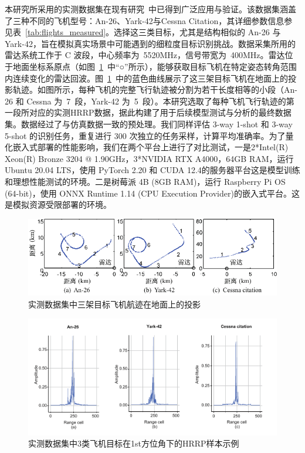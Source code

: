 本研究所采用的实测数据集在现有研究~中已得到广泛应用与验证。该数据集涵盖了三种不同的飞机型号：An-26、Yark-42与Cessna Citation，其详细参数信息参见表~\ref{tab:flights_measured}。选择这三类目标，尤其是结构相似的 An-26 与 Yark-42，旨在模拟真实场景中可能遇到的细粒度目标识别挑战。数据采集所用的雷达系统工作于 C 波段，中心频率为~5520$\mathrm{MHz}$，信号带宽为~400$\mathrm{MHz}$。雷达位于地面坐标系原点（如图~\ref{fig:route}~中“○”所示），能够获取目标飞机在特定姿态转角范围内连续变化的雷达回波。图~\ref{fig:route}~中的蓝色曲线展示了这三架目标飞机在地面上的投影轨迹。如图所示，每种飞机的完整飞行轨迹被分割为若干长度相等的小段（An-26 和 Cessna 为~7~段，Yark-42 为~5~段）。本研究选取了每种飞机飞行轨迹的{第一段}所对应的实测HRRP数据，据此构建了用于后续模型测试与分析的最终数据集。数据经过了与仿真数据一致的预处理。我们同样评估 3-way 1-shot 和 3-way 5-shot 的识别任务，重复进行 300 次独立的任务采样，计算平均准确率。为了量化嵌入式部署的性能影响，我们在两个平台上进行了对比测试，一是2*Intel(R) Xeon(R) Bronze 3204 @ 1.90GHz，3*NVIDIA RTX A4000，64GB RAM，运行 Ubuntu 20.04 LTS，使用 PyTorch 2.20 和 CUDA 12.4的服务器平台这是模型训练和理想性能测试的环境。二是树莓派 4B (8GB RAM)，运行 Raspberry Pi OS (64-bit)，使用 ONNX Runtime 1.14 (CPU Execution Provider)的嵌入式平台。这是模拟资源受限部署的环境。

\begin{figure}[h!]
\centering
\includegraphics[width=0.8\linewidth]{figures/route.pdf}
\caption{实测数据集中三架目标飞机航迹在地面上的投影} 
\label{fig:route} 
\end{figure}

\begin{figure}[h!]
    \centering
    \includegraphics[width=0.75\linewidth]{figures/measured.pdf}
    \caption{实测数据集中3类飞机目标在1st方位角下的HRRP样本示例}
    \label{fig:dataset_chap3}
\end{figure}

